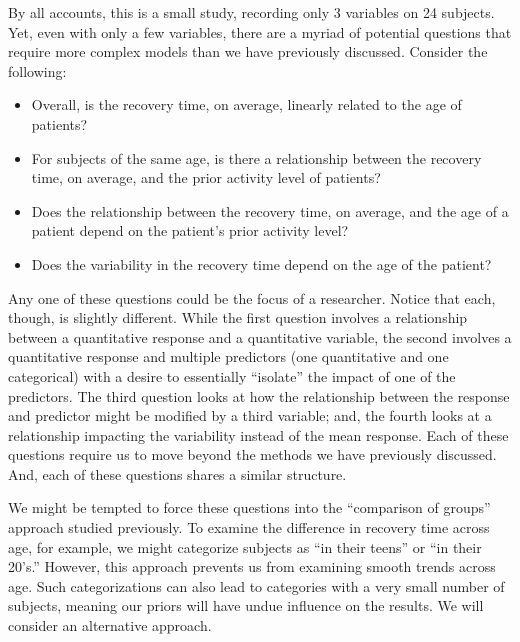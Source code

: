 \documentclass[
  letterpaper,
  DIV=11,
  numbers=noendperiod]{scrreprt}
\providecommand{\tightlist}{%
  \setlength{\itemsep}{0pt}\setlength{\parskip}{0pt}}\usepackage{longtable,booktabs,array}
\theoremstyle{definition}
\theoremstyle{plain}
\theoremstyle{definition}
\theoremstyle{remark}
\begin{document}
By all accounts, this is a small study, recording only 3 variables on 24
subjects. Yet, even with only a few variables, there are a myriad of
potential questions that require more complex models than we have
previously discussed. Consider the following:

\begin{itemize}
\tightlist
\item
  Overall, is the recovery time, on average, linearly related to the age
  of patients?
\item
  For subjects of the same age, is there a relationship between the
  recovery time, on average, and the prior activity level of patients?
\item
  Does the relationship between the recovery time, on average, and the
  age of a patient depend on the patient's prior activity level?
\item
  Does the variability in the recovery time depend on the age of the
  patient?
\end{itemize}

Any one of these questions could be the focus of a researcher. Notice
that each, though, is slightly different. While the first question
involves a relationship between a quantitative response and a
quantitative variable, the second involves a quantitative response and
multiple predictors (one quantitative and one categorical) with a desire
to essentially ``isolate'' the impact of one of the predictors. The
third question looks at how the relationship between the response and
predictor might be modified by a third variable; and, the fourth looks
at a relationship impacting the variability instead of the mean
response. Each of these questions require us to move beyond the methods
we have previously discussed. And, each of these questions shares a
similar structure.

We might be tempted to force these questions into the ``comparison of
groups'' approach studied previously. To examine the difference in
recovery time across age, for example, we might categorize subjects as
``in their teens'' or ``in their 20's.'' However, this approach prevents
us from examining smooth trends across age. Such categorizations can
also lead to categories with a very small number of subjects, meaning
our priors will have undue influence on the results. We will consider an
alternative approach.
\end{document}

